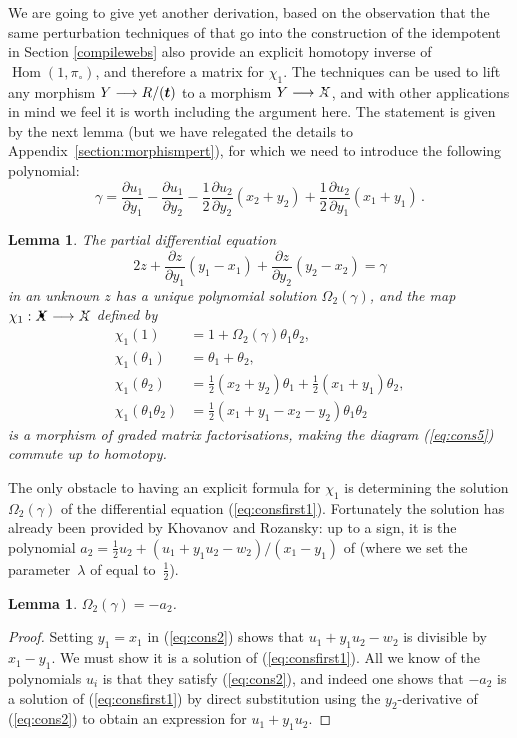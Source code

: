 \documentclass{compositio}
\newtheorem{lemma}[theorem]{Lemma}
\theoremstyle{definition}
\numberwithin{equation}{section}
\def\Hom{\operatorname{Hom}}
\begin{document}
We are going to give yet another derivation, based on the observation that the same perturbation techniques of \cite{dm1102.2957} that go into the construction of the idempotent in Section \ref{compilewebs} also provide an explicit homotopy inverse of $\Hom(1,\pi_{\circ})$, and therefore a matrix for $\chi_1$. The techniques can be used to lift any morphism $Y \longrightarrow R/(\boldsymbol{t})$ to a morphism $Y \lto \Xcirc$, and with other applications in mind we feel it is worth including the argument here. The statement is given by the next lemma (but we have relegated the details to Appendix~\ref{section:morphismpert}), for which we need to introduce the following polynomial:
\[
\gamma = \frac{\partial u_1}{\partial y_1} - \frac{\partial u_1}{\partial y_2} - \frac{1}{2} \frac{\partial u_2}{\partial y_2}(x_2 + y_2) + \frac{1}{2} \frac{\partial u_2}{\partial y_1}(x_1 + y_1) \, .
\]
\begin{lemma}\label{lemma:consfirst} The partial differential equation 
\begin{equation}\label{eq:consfirst1}
2 z + \frac{\partial z}{\partial y_1} (y_1 - x_1) + \frac{\partial z}{\partial y_2}(y_2 - x_2) = \gamma
\end{equation}
in an unknown $z$ has a unique polynomial solution $\Omega_2(\gamma)$, and the map $\chi_1: \Xbul \lto \Xcirc$ defined by
\begin{align*}
\chi_1(1) &= 1 + \Omega_2( \gamma )\theta_1 \theta_2,\\
\chi_1(\theta_1) &= \theta_1 + \theta_2,\\
\chi_1(\theta_2) &= \frac{1}{2}(x_2 + y_2)\theta_1 + \frac{1}{2}(x_1 + y_1)\theta_2,\\
\chi_1(\theta_1\theta_2) &= \frac{1}{2}(x_1 + y_1 - x_2 - y_2) \theta_1\theta_2
\end{align*}
is a morphism of graded matrix factorisations, making the diagram (\ref{eq:cons5}) commute up to homotopy.
\end{lemma}

The only obstacle to having an explicit formula for $\chi_1$ is determining the solution $\Omega_2(\gamma)$ of the differential equation (\ref{eq:consfirst1}). Fortunately the solution has already been provided by Khovanov and Rozansky: up to a sign, it is the polynomial $a_2 = \frac{1}{2}u_2 + (u_1 + y_1 u_2 - w_2)/(x_1-y_1)$ of \cite[p.51]{kr0401268} (where we set the parameter~$\lambda$ of \cite{kr0401268} equal to~$\frac{1}{2}$).

\begin{lemma} $\Omega_2(\gamma) = -a_2$.
\end{lemma}
\begin{proof}
Setting $y_1 = x_1$ in (\ref{eq:cons2}) shows that $u_1 + y_1 u_2 - w_2$ is divisible by $x_1 - y_1$. We must show it is a solution of (\ref{eq:consfirst1}). All we know of the polynomials $u_i$ is that they satisfy (\ref{eq:cons2}), and indeed one shows that $-a_2$ is a solution of (\ref{eq:consfirst1}) by direct substitution using the $y_2$-derivative of (\ref{eq:cons2}) to obtain an expression for $u_1 + y_1 u_2$.
\end{proof}
\end{document}
